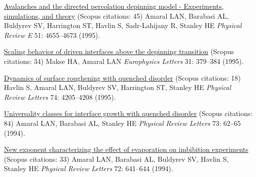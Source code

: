 \NumberedItem{\makebox[0.8cm][r]{[6]}}
\href{/people/amaral/avalanches-and-the-directed-percolation-depinning-model-experiments-simulations-and-theory}
{Avalanches and the directed percolation depinning model - Experiments, simulations, and theory}
    (Scopus citations: 45)
\newline
Amaral LAN, Barabasi AL, Buldyrev SV, Harrington ST, Havlin S, Sadr-Lahijany R, Stanley HE
\newline
\textit{Physical Review E}
    51:
4655--4673 (1995).
\newline
\Gap
~
\Gap

\NumberedItem{\makebox[0.8cm][r]{[5]}}
\href{/people/amaral/scaling-behavior-of-driven-interfaces-above-the-depinning-transition}
{Scaling behavior of driven interfaces above the depinning transition}
    (Scopus citations: 34)
\newline
Makse HA, Amaral LAN
\newline
\textit{Europhysics Letters}
    31:
379--384 (1995).
\newline
\Gap
~
\Gap

\NumberedItem{\makebox[0.8cm][r]{[4]}}
\href{/people/amaral/dynamics-of-surface-roughening-with-quenched-disorder}
{Dynamics of surface roughening with quenched disorder}
    (Scopus citations: 18)
\newline
Havlin S, Amaral LAN, Buldyrev SV, Harrington ST, Stanley HE
\newline
\textit{Physical Review Letters}
    74:
4205--4208 (1995).
\newline
\Gap
~
\Gap

\NumberedItem{\makebox[0.8cm][r]{[3]}}
\href{/people/amaral/universality-classes-for-interface-growth-with-quenched-disorder}
{Universality classes for interface growth with quenched disorder}
    (Scopus citations: 84)
\newline
Amaral LAN, Barabasi AL, Stanley HE
\newline
\textit{Physical Review Letters}
    73:
62--65 (1994).
\newline
\Gap
~
\Gap

\NumberedItem{\makebox[0.8cm][r]{[2]}}
\href{/people/amaral/new-exponent-characterizing-the-effect-of-evaporation-on-imbibition-experiments}
{New exponent characterizing the effect of evaporation on imbibition experiments}
    (Scopus citations: 33)
\newline
Amaral LAN, Barabasi AL, Buldyrev SV, Havlin S, Stanley HE
\newline
\textit{Physical Review Letters}
    72:
641--644 (1994).
\newline
\Gap
~
\Gap

